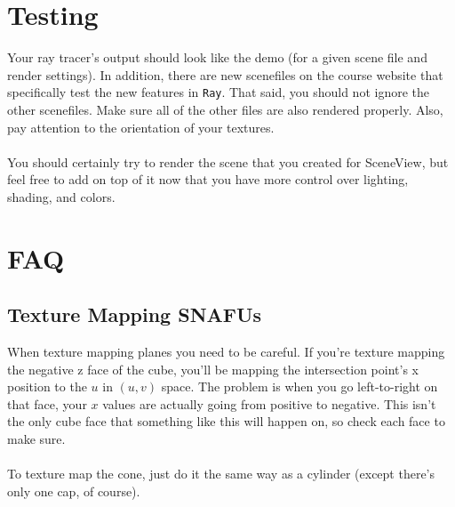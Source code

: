 \documentclass[10pt,twocolumn]{article}
\begin{document}
\section{Testing}
Your ray tracer's output should look like the demo (for a given scene file and render settings). In addition,  there are new scenefiles on the course website that specifically test the new features in {\tt Ray}. That said, you should not ignore the other scenefiles. Make sure all of the other files are also rendered properly. Also, pay attention to the orientation of your textures.
\\\\You should certainly try to render the scene that you created for SceneView, but feel free to add on top of it now that you have more control over lighting, shading, and colors.%
\section{FAQ}
\subsection{Texture Mapping SNAFUs}
When texture mapping planes you need to be careful. If you're texture mapping the negative z face of the cube, you'll be mapping the intersection point's x position to the $u$ in $(u,v)$ space. The problem is when you go left-to-right on that face, your $x$ values are actually going from positive to negative. This isn't the only cube face that something like this will happen on, so check each face to make sure.\\\\To texture map the cone, just do it the same way as a cylinder (except there's only one cap, of course).
\end{document}
